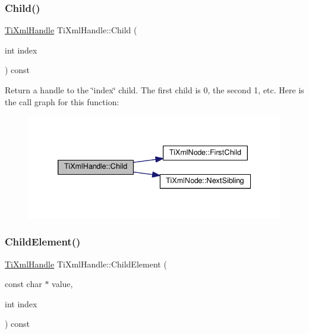 \subsubsection{\texorpdfstring{Child()}{Child()}\hspace{0.1cm}{\footnotesize\ttfamily [2/2]}}
{\footnotesize\ttfamily \hyperlink{class_ti_xml_handle}{Ti\+Xml\+Handle} Ti\+Xml\+Handle\+::\+Child (\begin{DoxyParamCaption}\item[{int}]{index }\end{DoxyParamCaption}) const}

Return a handle to the \char`\"{}index\char`\"{} child. The first child is 0, the second 1, etc. Here is the call graph for this function\+:\nopagebreak
\begin{figure}[H]
\begin{center}
\leavevmode
\includegraphics[width=339pt]{class_ti_xml_handle_a32585942abb28e03eea9c5223f38a659_cgraph}
\end{center}
\end{figure}
\mbox{\label{class_ti_xml_handle_afccc59d8a0daa8c5d78474fbed430ddb}} 
\subsubsection{\texorpdfstring{Child\+Element()}{ChildElement()}\hspace{0.1cm}{\footnotesize\ttfamily [1/2]}}
{\footnotesize\ttfamily \hyperlink{class_ti_xml_handle}{Ti\+Xml\+Handle} Ti\+Xml\+Handle\+::\+Child\+Element (\begin{DoxyParamCaption}\item[{const char $\ast$}]{value,  }\item[{int}]{index }\end{DoxyParamCaption}) const}

